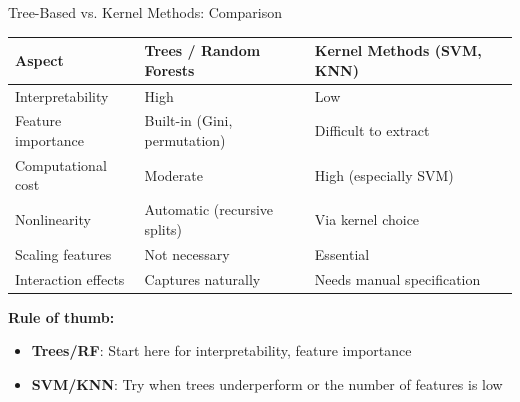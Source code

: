 \documentclass[11pt]{beamer}
\begin{document}
\begin{frame}[fragile]{Tree-Based vs. Kernel Methods: Comparison}
	\begin{table}
		\scriptsize
		\centering
		\setlength{\tabcolsep}{4pt}
		\renewcommand{\arraystretch}{1.15}
		\begin{tabular}{|p{}|p{}|p{}|}
			\hline
			\textbf{Aspect} & \textbf{Trees / Random Forests} & \textbf{Kernel Methods (SVM, KNN)} \\
			\hline
			Interpretability & High & Low \\
			\hline
			Feature importance & Built-in (Gini, permutation) & Difficult to extract \\
			\hline
			Computational cost & Moderate & High (especially SVM) \\
			\hline
			Nonlinearity & Automatic (recursive splits) & Via kernel choice \\
			\hline
			Scaling features & Not necessary & Essential \\
			\hline
			Interaction effects & Captures naturally & Needs manual specification \\
			\hline
		\end{tabular}
	\end{table}

	\vspace{0.2cm}

	\textbf{Rule of thumb:}
	\begin{itemize}
		\small
		\setlength{\itemsep}{0.1cm}
		\item \textbf{Trees/RF}: Start here for interpretability, feature importance
		\item \textbf{SVM/KNN}: Try when trees underperform or the number of features is low
	\end{itemize}
\end{frame}
\end{document}
